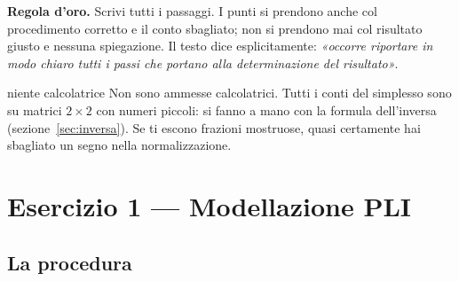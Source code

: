 \documentclass[11pt,a4paper]{article}
\begin{document}
\begin{idea}
\textbf{Regola d'oro.} Scrivi tutti i passaggi. I punti si prendono anche col procedimento
corretto e il conto sbagliato; non si prendono mai col risultato giusto e nessuna spiegazione.
Il testo dice esplicitamente: \emph{«occorre riportare in modo chiaro tutti i passi che portano
alla determinazione del risultato»}.
\end{idea}

\begin{att}{niente calcolatrice}
Non sono ammesse calcolatrici. Tutti i conti del simplesso sono su matrici $2\times 2$
con numeri piccoli: si fanno a mano con la formula dell'inversa (sezione~\ref{sec:inversa}).
Se ti escono frazioni mostruose, quasi certamente hai sbagliato un segno nella normalizzazione.
\end{att}

\newpage
\section{Esercizio 1 --- Modellazione PLI}

\subsection{La procedura}
\end{document}
